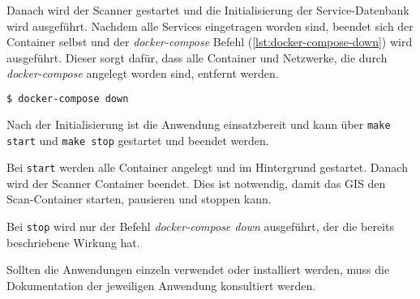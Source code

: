 Danach wird der Scanner gestartet und die Initialisierung der Service-Datenbank wird ausgeführt. Nachdem alle Services eingetragen worden sind, beendet sich der Container selbst und der \textit{docker-compose} Befehl (\autoref{lst:docker-compose-down}) wird ausgeführt. Dieser sorgt dafür, dass alle Container und Netzwerke, die durch \textit{docker-compose} angelegt worden sind, entfernt werden.

\begin{lstlisting}[language=bash, caption={Aufräumen mit docker-compose down (bash)}, captionpos=b, label={lst:docker-compose-down}]
$ docker-compose down
\end{lstlisting}

Nach der Initialisierung ist die Anwendung einsatzbereit und kann über \texttt{make start} und \texttt{make stop} gestartet und beendet werden.

Bei \texttt{start} werden alle Container angelegt und im Hintergrund gestartet. Danach wird der Scanner Container beendet. Dies ist notwendig, damit das GIS den Scan-Container starten, pausieren und stoppen kann.

Bei \texttt{stop} wird nur der Befehl \textit{docker-compose down} ausgeführt, der die bereits beschriebene Wirkung hat.

Sollten die Anwendungen einzeln verwendet oder installiert werden, muss die Dokumentation der jeweiligen Anwendung konsultiert werden.